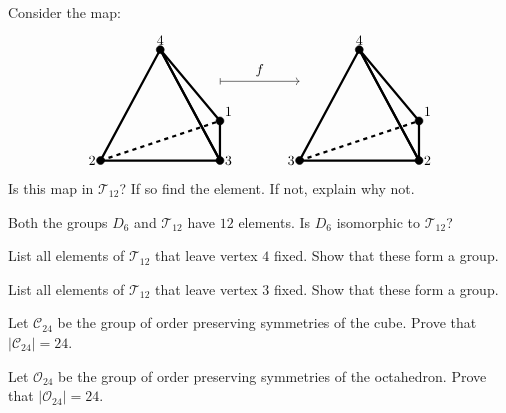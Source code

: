 \documentclass{ximera}
\begin{document}
\begin{exercise}
  Consider the map:
  \[
  \begin{tikzpicture}
  \draw[ultra thick,rounded corners=.05mm] (0,0) -- (3,0) -- (1.5,2.8) -- cycle;
  \draw[ultra thick,rounded corners=.05mm] (3,1) -- (3,0) -- (1.5,2.8) -- cycle;
  \draw[ultra thick,dashed] (0,0) -- (3,1);
  \draw[fill] (3,1) circle (1mm) node[above right] {$1$};
  \draw[fill] (0,0) circle (1mm) node[left] {$2$};
  \draw[fill] (3,0) circle (1mm) node[right] {$3$};
  \draw[fill] (1.5,2.8) circle (1mm) node[above] {$4$};

  \draw[|->] (3,2) -- (5,2);
  \node[above] at (4,2) {$f$};
  
  \draw[ultra thick,rounded corners=.05mm] (5,0) -- (8,0) -- (6.5,2.8) -- cycle;
  \draw[ultra thick,rounded corners=.05mm] (8,1) -- (8,0) -- (6.5,2.8) -- cycle;
  \draw[ultra thick,dashed] (5,0) -- (8,1);
  \draw[fill] (8,1) circle (1mm) node[above right] {$1$};
  \draw[fill] (5,0) circle (1mm) node[left] {$3$};
  \draw[fill] (8,0) circle (1mm) node[right] {$2$};
  \draw[fill] (6.5,2.8) circle (1mm) node[above] {$4$};
  \end{tikzpicture}
  \]
  Is this map in $\mathcal{T}_{12}$? If so find the element. If not, explain why
  not.
\end{exercise}

\begin{exercise}
  Both the groups $D_6$ and $\mathcal{T}_{12}$ have $12$ elements. Is
  $D_6$ isomorphic to $\mathcal{T}_{12}$?
\end{exercise}



\begin{exercise}
  List all elements of $\mathcal{T}_{12}$ that leave vertex $4$ fixed. Show that these
  form a group.
\end{exercise}

\begin{exercise}
  List all elements of $\mathcal{T}_{12}$ that leave vertex $3$ fixed. Show that these
  form a group.
\end{exercise}

\begin{exercise}\label{E:symcube}
  Let $\mathcal{C}_{24}$ be the group of order preserving symmetries of the
  cube. Prove that $|\mathcal{C}_{24}| = 24$.
\end{exercise}

\begin{exercise}\label{E:symoct}
  Let $\mathcal{O}_{24}$ be the group of order preserving symmetries of the
  octahedron. Prove that $|\mathcal{O}_{24}|= 24$.
\end{exercise}
\end{document}

